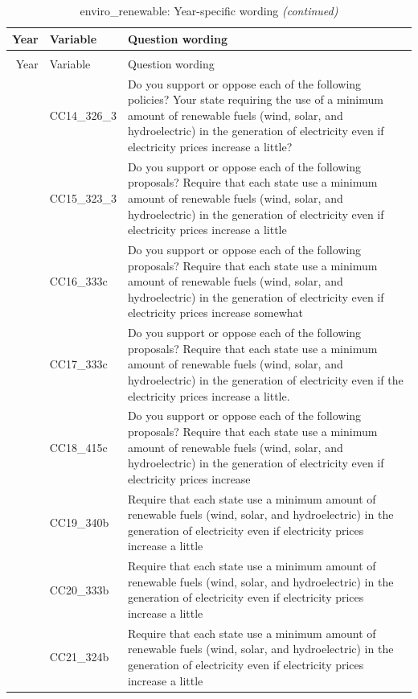 \documentclass[
  12pt]{article}
\begin{document}
\begin{longtable}[t]{rl>{\raggedright\arraybackslash}p{10cm}}
\caption{\label{tab:unnamed-chunk-5}enviro\_renewable: Year-specific wording}\\
\toprule
Year & Variable & Question wording\\
\midrule
\endfirsthead
\caption[]{enviro\_renewable: Year-specific wording \textit{(continued)}}\\
\toprule
Year & Variable & Question wording\\
\midrule
\endhead

\endfoot
\bottomrule
\endlastfoot
2014 & CC14\_326\_3 & Do you support or oppose each of the following policies? Your state requiring the use of a minimum amount of renewable fuels (wind, solar, and hydroelectric) in the generation of electricity even if electricity prices increase a little?\\
\addlinespace
2015 & CC15\_323\_3 & Do you support or oppose each of the following proposals? Require that each state use a minimum amount of renewable fuels (wind, solar, and hydroelectric) in the generation of electricity even if electricity prices increase a little\\
\addlinespace
2016 & CC16\_333c & Do you support or oppose each of the following proposals? Require that each state use a minimum amount of renewable fuels (wind, solar, and hydroelectric) in the generation of electricity even if electricity prices increase somewhat\\
\addlinespace
2017 & CC17\_333c & Do you support or oppose each of the following proposals? Require that each state use a minimum amount of renewable fuels (wind, solar, and hydroelectric) in the generation of electricity even if the electricity prices increase a little.\\
\addlinespace
2018 & CC18\_415c & Do you support or oppose each of the following proposals? Require that each state use a minimum amount of renewable fuels (wind, solar, and hydroelectric) in the generation of electricity even if electricity prices increase\\
\addlinespace
2019 & CC19\_340b & Require that each state use a minimum amount of renewable fuels (wind, solar, and hydroelectric) in the generation of electricity even if electricity prices increase a little\\
\addlinespace
2020 & CC20\_333b & Require that each state use a minimum amount of renewable fuels (wind, solar, and hydroelectric) in the generation of electricity even if electricity prices increase a little\\
\addlinespace
2021 & CC21\_324b & Require that each state use a minimum amount of renewable fuels (wind, solar, and hydroelectric) in the generation of electricity even if electricity prices increase a little\\*
\end{longtable}
\endgroup{}
\end{document}
